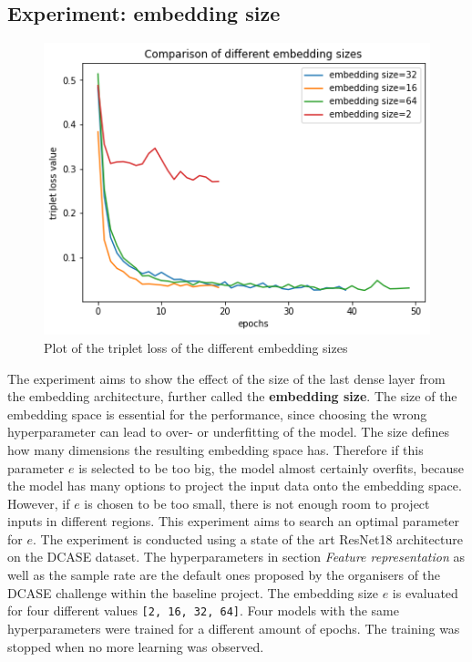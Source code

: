 \subsection{Experiment: embedding size}
\begin{figure}[t]
\centering
    \includegraphics[width=0.5\linewidth]{study-doc/experiment_embedding_size/assets/plot_embedding_sizes.png}
    \caption{Plot of the triplet loss of the different embedding sizes}
    \label{fig:plot-embeddings-epochs}
\end{figure}
The experiment aims to show the effect of the size of the last dense layer from the embedding architecture, further called the \textbf{embedding size}. The size of the embedding space is essential for the performance, since choosing the wrong hyperparameter can lead to over- or underfitting of the model. The size defines how many dimensions the resulting embedding space has. Therefore if this parameter $e$ is selected to be too big, the model almost certainly overfits, because the model has many options to project the input data onto the embedding space. However, if $e$ is chosen to be too small, there is not enough room to project inputs in different regions. This experiment aims to search an optimal parameter for $e$.
\newline
\newline
The experiment is conducted using a state of the art ResNet18 architecture on the DCASE dataset. The hyperparameters in section \textit{Feature representation} as well as the sample rate are the default ones proposed by the organisers of the DCASE challenge within the baseline project. The embedding size $e$ is evaluated for four different values \texttt{[2, 16, 32, 64]}.
\newline
\newline
Four models with the same hyperparameters were trained for a different amount of epochs. The training was stopped when no more learning was observed. 
\newline
\newline
